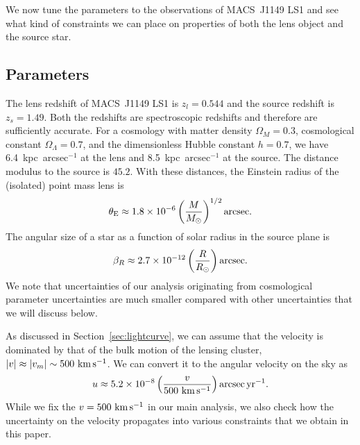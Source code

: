 \documentclass[showpacs,twocolumn,preprintnumbers,amsmath,amssymb,superscriptaddress,nofootinbib]{revtex4}
\newcommand{\morv}[1]{#1}
\begin{document}
We now tune the parameters to the observations of MACS~J1149 LS1
\cite{Kelly:2017fps} and see what kind of constraints we can place on
properties of both the lens object and the source star.

\subsection{Parameters}

The lens redshift of MACS~J1149 LS1 is $z_l=0.544$ and the source
redshift is $z_s=1.49$. \morv{Both the redshifts are spectroscopic
  redshifts and therefore are sufficiently accurate.}
For a cosmology with matter density $\Omega_M=0.3$, cosmological
constant $\Omega_\Lambda=0.7$, and the dimensionless Hubble constant
$h=0.7$, we have 6.4~kpc~arcsec$^{-1}$ at the lens and
8.5~kpc~arcsec$^{-1}$ at the source. The distance modulus to the
source is $45.2$.  With these distances, the Einstein radius of the
(isolated) point mass lens is 
\begin{equation}
  \theta_{\rm E}\approx 1.8\times 10^{-6}
  \left(\frac{M}{M_\odot}\right)^{1/2}{\rm arcsec}.
\label{eq:tein_ls1}
\end{equation}
The angular size of a star as a function of solar radius in the source
plane is
\begin{equation}
\beta_R\approx 2.7\times 10^{-12}\left(\frac{R}{R_\odot}\right){\rm arcsec}.
\label{eq:berls1}
\end{equation}
\morv{We note that uncertainties of our analysis originating from
  cosmological parameter uncertainties are much smaller compared with
  other uncertainties that we will discuss below.}

As discussed in Section~\ref{sec:lightcurve}, we can assume that the
velocity is dominated by that of the bulk motion of the lensing
cluster, $|v|\approx |v_m|\sim 500~{\rm km\,s^{-1}}$. We can convert it to the
angular velocity on the sky as 
\begin{equation}
u \approx 5.2\times 10^{-8} \left(\frac{v}{500~{\rm
  km\,s^{-1}}}\right){\rm arcsec\,yr^{-1}}.
\label{eq:u_ls1}
\end{equation}
\morv{While we fix the $v=500~{\rm km\,s^{-1}}$ in our main analysis,
we also check how the uncertainty on the velocity propagates into
various constraints that we obtain in this paper.}
\end{document}
